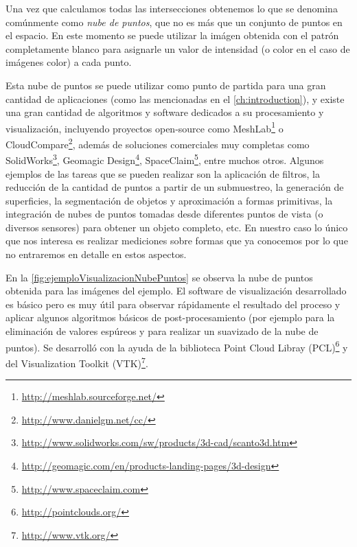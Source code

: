 Una vez que calculamos todas las intersecciones obtenemos lo que se denomina comúnmente como \emph{nube de puntos}, que no es más que un conjunto de puntos en el espacio. En este momento se puede utilizar la imágen obtenida con el patrón completamente blanco para asignarle un valor de intensidad (o color en el caso de imágenes color) a cada punto.

Esta nube de puntos se puede utilizar como punto de partida para una gran cantidad de aplicaciones (como las mencionadas en el \autoref{ch:introduction}), y existe una gran cantidad de algoritmos y software dedicados a su procesamiento y visualización, incluyendo proyectos open-source como MeshLab\footnote{\url{http://meshlab.sourceforge.net/}} o CloudCompare\footnote{\url{http://www.danielgm.net/cc/}}, además de soluciones comerciales muy completas como SolidWorks\footnote{\url{http://www.solidworks.com/sw/products/3d-cad/scanto3d.htm}}, Geomagic Design\footnote{\url{http://geomagic.com/en/products-landing-pages/3d-design}}, SpaceClaim\footnote{\url{http://www.spaceclaim.com}}, entre muchos otros. Algunos ejemplos de las tareas que se pueden realizar son la aplicación de filtros, la reducción de la cantidad de puntos a partir de un submuestreo, la generación de superficies, la segmentación de objetos y aproximación a formas primitivas, la integración de nubes de puntos tomadas desde diferentes puntos de vista (o diversos sensores) para obtener un objeto completo, etc.
En nuestro caso lo único que nos interesa es realizar mediciones sobre formas que ya conocemos por lo que no entraremos en detalle en estos aspectos.

En la \autoref{fig:ejemploVisualizacionNubePuntos} se observa la nube de puntos obtenida para las imágenes del ejemplo. El software de visualización desarrollado es básico pero es muy útil para observar rápidamente el resultado del proceso y aplicar algunos algoritmos básicos de post-procesamiento (por ejemplo para la eliminación de valores espúreos y para realizar un suavizado de la nube de puntos). Se desarrolló con la ayuda de la biblioteca Point Cloud Libray (PCL)\footnote{\url{http://pointclouds.org/}} y del Visualization Toolkit (VTK)\footnote{\url{http://www.vtk.org/}}.

